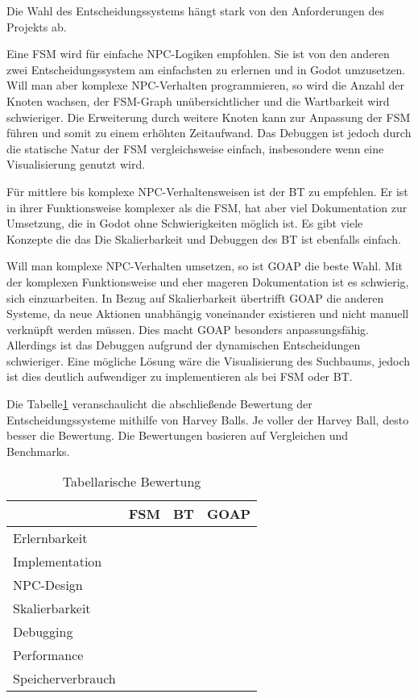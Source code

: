 Die Wahl des Entscheidungssystems h\"{a}ngt stark von den Anforderungen des Projekts ab.

Eine FSM wird f\"{u}r einfache NPC-Logiken empfohlen. Sie ist von den anderen zwei Entscheidungssystem am einfachsten zu erlernen und in Godot umzusetzen. Will man aber komplexe NPC-Verhalten programmieren, so wird die Anzahl der Knoten wachsen, der FSM-Graph un\"{u}bersichtlicher und die Wartbarkeit wird schwieriger. Die Erweiterung durch weitere Knoten kann zur Anpassung der FSM f\"{u}hren und somit zu einem erh\"{o}hten Zeitaufwand. Das Debuggen ist jedoch durch die statische Natur der FSM vergleichsweise einfach, insbesondere wenn eine Visualisierung genutzt wird.

F\"{u}r mittlere bis komplexe NPC-Verhaltensweisen ist der BT zu empfehlen. Er ist in ihrer Funktionsweise komplexer als die FSM, hat aber viel Dokumentation zur Umsetzung, die in Godot ohne Schwierigkeiten m\"{o}glich ist. Es gibt viele Konzepte die das 
Die Skalierbarkeit und Debuggen des BT ist ebenfalls einfach.

Will man komplexe NPC-Verhalten umsetzen, so ist GOAP die beste Wahl. Mit der komplexen Funktionsweise und eher mageren Dokumentation ist es schwierig, sich einzuarbeiten. In Bezug auf Skalierbarkeit \"{u}bertrifft GOAP die anderen Systeme, da neue Aktionen unabh\"{a}ngig voneinander existieren und nicht manuell verkn\"{u}pft werden m\"{u}ssen. Dies macht GOAP besonders anpassungsf\"{a}hig. Allerdings ist das Debuggen aufgrund der dynamischen Entscheidungen schwieriger. Eine m\"{o}gliche L\"{o}sung w\"{a}re die Visualisierung des Suchbaums, jedoch ist dies deutlich aufwendiger zu implementieren als bei FSM oder BT.

Die Tabelle\ref{tab:es vergleich tabelle} veranschaulicht die abschlie\ss{}ende Bewertung der Entscheidungssysteme mithilfe von Harvey Balls. Je voller der Harvey Ball, desto besser die Bewertung. Die Bewertungen basieren auf Vergleichen und Benchmarks.


\begin{table}[h]
  \caption{Tabellarische Bewertung}
  \label{tab:es vergleich tabelle}
  \centering
  \begin{tabular}{lccc}
    \toprule
    & FSM & BT & GOAP\\
    \midrule
		Erlernbarkeit & \harveyBallFull & \harveyBallThreeQuarter & \harveyBallHalf\\
    Implementation	& \harveyBallFull  & \harveyBallThreeQuarter  & \harveyBallHalf\\
		NPC-Design & \harveyBallQuarter & \harveyBallThreeQuarter & \harveyBallFull\\
    Skalierbarkeit	& \harveyBallQuarter & \harveyBallHalf & \harveyBallFull\\
    Debugging	& \harveyBallHalf & \harveyBallThreeQuarter & \harveyBallQuarter\\
		Performance & \harveyBallFull & \harveyBallThreeQuarter & \harveyBallHalf\\
		Speicherverbrauch & \harveyBallFull & \harveyBallFull & \harveyBallThreeQuarter\\
    \bottomrule
  \end{tabular}
\end{table}